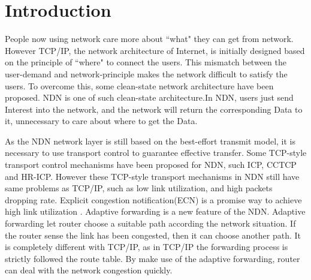 
\section{Introduction}
People now using network care more about ``what" they can get from network. However TCP/IP, the network architecture of Internet, is initially designed based on the principle of ``where" to connect the users. This mismatch between the user-demand and network-principle makes the network difficult to satisfy the users. To overcome this, some clean-state network architecture have been proposed. NDN is one of such clean-state architecture\cite{NDN}.In NDN, users just send Interest into the network, and the network will return the corresponding Data to it, unnecessary to care about where to get the Data.

As the NDN network layer is still based on the best-effort transmit model, it is necessary to use transport control to guarantee effective transfer. Some TCP-style transport control mechanisms have been proposed for NDN, such ICP\cite{ICP}, CCTCP\cite{CCTCP} and HR-ICP\cite{shape}. However these TCP-style transport mechanisms in NDN still have same problems as TCP/IP, such as low link utilization, and high packets dropping rate. Explicit congestion notification(ECN) is a promise way to achieve high link utilization\cite{XCP} . Adaptive forwarding is a new feature of the NDN\cite{Adaptive}. Adaptive forwarding let router choose a suitable path according the network situation. If the router sense the link has been congested, then it can choose another path. It is completely different with TCP/IP, as in TCP/IP the forwarding process is strictly followed the route table. By make use of the adaptive forwarding, router can deal with the network congestion quickly.

